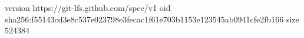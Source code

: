 version https://git-lfs.github.com/spec/v1
oid sha256:f55143cd3e8c537e023798e3fecac1f61e703b1153e123545ab0941cfe2fb166
size 524384
